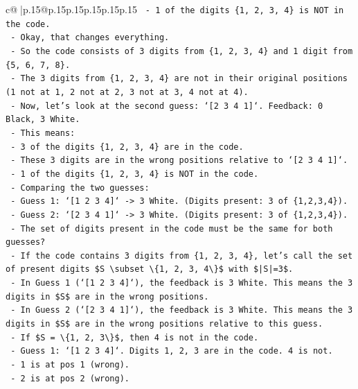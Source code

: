 \documentclass{article}
\begin{document}
{\begin{supertabular}{c@{$\;$}|p{.15\linewidth}@{}p{.15\linewidth}p{.15\linewidth}p{.15\linewidth}p{.15\linewidth}p{.15\linewidth}}
{{{\texttt{    {-} 1 of the digits \{1, 2, 3, 4\} is NOT in the code.} \\
\texttt{  {-} Okay, that changes everything.} \\
\texttt{  {-} So the code consists of 3 digits from \{1, 2, 3, 4\} and 1 digit from \{5, 6, 7, 8\}.} \\
\texttt{  {-} The 3 digits from \{1, 2, 3, 4\} are not in their original positions (1 not at 1, 2 not at 2, 3 not at 3, 4 not at 4).} \\
\texttt{  {-} Now, let's look at the second guess: `{[}2 3 4 1{]}`. Feedback: 0 Black, 3 White.} \\
\texttt{  {-} This means:} \\
\texttt{    {-} 3 of the digits \{1, 2, 3, 4\} are in the code.} \\
\texttt{    {-} These 3 digits are in the wrong positions relative to `{[}2 3 4 1{]}`.} \\
\texttt{    {-} 1 of the digits \{1, 2, 3, 4\} is NOT in the code.} \\
\texttt{  {-} Comparing the two guesses:} \\
\texttt{    {-} Guess 1: `{[}1 2 3 4{]}` {-}> 3 White. (Digits present: 3 of \{1,2,3,4\}).} \\
\texttt{    {-} Guess 2: `{[}2 3 4 1{]}` {-}> 3 White. (Digits present: 3 of \{1,2,3,4\}).} \\
\texttt{  {-} The set of digits present in the code must be the same for both guesses?} \\
\texttt{  {-} If the code contains 3 digits from \{1, 2, 3, 4\}, let's call the set of present digits \$S \textbackslash{}subset \textbackslash{}\{1, 2, 3, 4\textbackslash{}\}\$ with \$|S|=3\$.} \\
\texttt{  {-} In Guess 1 (`{[}1 2 3 4{]}`), the feedback is 3 White. This means the 3 digits in \$S\$ are in the wrong positions.} \\
\texttt{  {-} In Guess 2 (`{[}2 3 4 1{]}`), the feedback is 3 White. This means the 3 digits in \$S\$ are in the wrong positions relative to this guess.} \\
\texttt{  {-} If \$S = \textbackslash{}\{1, 2, 3\textbackslash{}\}\$, then 4 is not in the code.} \\
\texttt{    {-} Guess 1: `{[}1 2 3 4{]}`. Digits 1, 2, 3 are in the code. 4 is not.} \\
\texttt{      {-} 1 is at pos 1 (wrong).} \\
\texttt{      {-} 2 is at pos 2 (wrong).} \\
}}}
\end{supertabular}}
\end{document}
